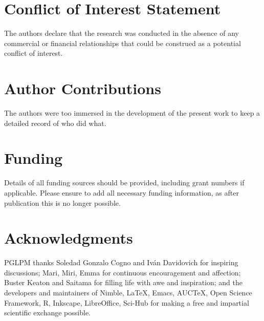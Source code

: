 \documentclass[utf8]{FrontiersinHarvard} %
\providecommand{\href}[2]{#2}
\renewcommand*{\|}[1][]{\nonscript\:#1\vert\nonscript\:\mathopen{}}
\begin{document}
\section*{Conflict of Interest Statement}

The authors declare that the research was conducted in the absence of any commercial or financial relationships that could be construed as a potential conflict of interest.

\section*{Author Contributions}

The authors were too immersed in the development of the present work to keep a detailed record of who did what.


\section*{Funding}
Details of all funding sources should be provided, including grant numbers if applicable. Please ensure to add all necessary funding information, as after publication this is no longer possible.

\section*{Acknowledgments}
PGLPM thanks Soledad Gonzalo Cogno and Iv\'an Davidovich for inspiring discussions;
Mari, Miri, Emma for continuous encouragement and affection; Buster Keaton and Saitama for filling life with awe and inspiration; and the developers and maintainers of Nimble, \LaTeX, Emacs, AUC\TeX, Open Science Framework, R, Inkscape, LibreOffice, Sci-Hub for making a free and impartial scientific exchange possible.
\end{document}
